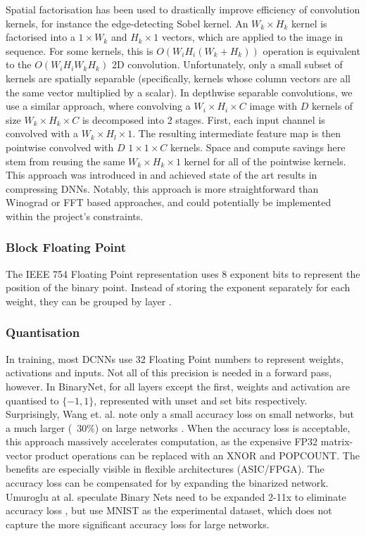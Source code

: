 \documentclass[12pt]{article}
\begin{document}
Spatial factorisation has been used to drastically improve efficiency of convolution kernels,
for instance the edge-detecting Sobel kernel.
An $W_k \times H_k$ kernel is factorised into a $1 \times W_k$ and $H_k \times 1$ vectors,
which are applied to the image in sequence.
For some kernels, this is $O(W_iH_i(W_k + H_k))$ operation is equivalent to the $O(W_iH_iW_kH_k)$
2D convolution.
Unfortunately, only a small subset of kernels are spatially separable (specifically, kernels
whose column vectors are all the same vector multiplied by a scalar).
In depthwise separable convolutions, we use a similar approach, where convolving a $W_i \times
H_i \times C$ image with $D$ kernels of size $W_k \times H_k \times C$ is decomposed into 2 stages.
First, each input channel is convolved with a $W_k \times H_l \times 1$.
The resulting intermediate feature map is then pointwise convolved with $D$ $1 \times 1 \times
C$ kernels.
Space and compute savings here stem from reusing the same $W_k \times H_k \times 1$ kernel for
all of the pointwise kernels.
This approach was introduced in \cite{howard2017mobilenets} and achieved state of the art results
in compressing DNNs. Notably, this approach is more straightforward than Winograd or FFT
based approaches, and could potentially be implemented within the project's constraints.

\subsubsection{Block Floating Point}
The IEEE 754 Floating Point representation uses 8 exponent bits to represent the position of
the binary point.
Instead of storing the exponent separately for each weight, they can be grouped by layer
\cite{courbariaux2014training}.

\subsubsection{Quantisation}
In training, most DCNNs use 32 Floating Point numbers to represent weights, activations and inputs.
Not all of this precision is needed in a forward pass, however.
In BinaryNet, for all layers except the first, weights and activation are quantised to $\{-1,
1\}$, represented with unset and set bits respectively.
Surprisingly, Wang et. al. note only a small accuracy loss on small
networks\cite{courbariaux2016binarynet}, but a much larger (~30\%) on large networks
\cite{wang2019deep}.
When the accuracy loss is acceptable, this approach massively accelerates computation,
as the expensive FP32 matrix-vector product operations can be replaced with an XNOR and
POPCOUNT\cite{courbariaux2016binarynet}.
The benefits are especially visible in flexible architectures (ASIC/FPGA).
The accuracy loss can be compensated for by expanding the binarized network.
Umuroglu at al. speculate Binary Nets need to be expanded 2-11x to eliminate accuracy loss
\cite{umuroglu2016finn},
but use MNIST as the experimental dataset, which does not capture the more significant accuracy
loss for large networks.
\end{document}

